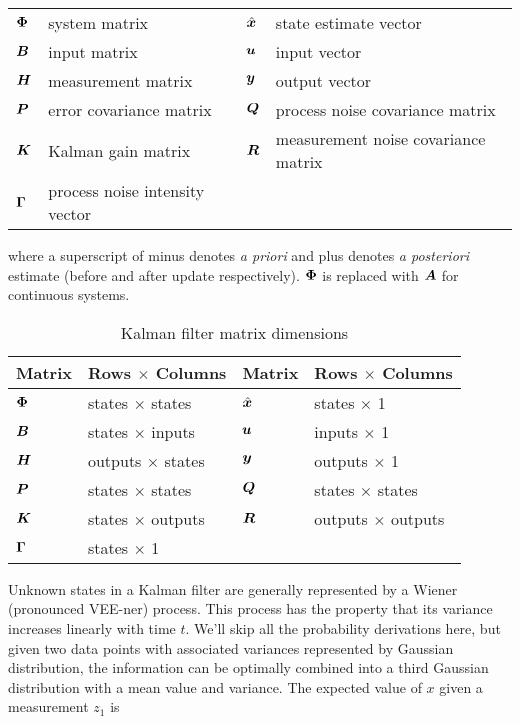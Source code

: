 \begin{center}
  \renewcommand{\arraystretch}{1.3}
  \begin{tabulary}{\linewidth}{LLLL}
    $\bm \Phi$ & system matrix & $\hat{\bm x}$ & state estimate vector \\
    $\bm B$ & input matrix            & $\bm u$ & input vector \\
    $\bm H$ & measurement matrix      & $\bm y$ & output vector \\
    $\bm P$ & error covariance matrix & $\bm Q$ & process noise covariance
      matrix \\
    $\bm K$ & Kalman gain matrix & $\bm R$ & measurement noise covariance
      matrix \\
    $\bm \Gamma$ & process noise intensity vector &
  \end{tabulary}
\end{center}

where a superscript of minus denotes \textit{a priori} and plus denotes
\textit{a posteriori} estimate (before and after update respectively).
$\bm \Phi$ is replaced with $\bm A$ for continuous systems.

\begin{table}
  \caption{Kalman filter matrix dimensions}
  \renewcommand{\arraystretch}{1.5}
  \centering
  \begin{tabular}{|ll|ll|}
    \hline
    \rowcolor{lightblue}
    \textbf{Matrix} & \textbf{Rows $\times$ Columns} &
    \textbf{Matrix} & \textbf{Rows $\times$ Columns} \\
    \hline
    $\bm \Phi$ & states $\times$ states & $\hat{\bm x}$ & states $\times$ 1
      \\
    $\bm B$ & states $\times$ inputs & $\bm u$ & inputs $\times$ 1 \\
    $\bm H$ & outputs $\times$ states & $\bm y$ & outputs $\times$ 1 \\
    $\bm P$ & states $\times$ states & $\bm Q$ & states $\times$ states \\
    $\bm K$ & states $\times$ outputs & $\bm R$ & outputs $\times$ outputs
      \\
    $\bm \Gamma$ & states $\times$ 1 &  &  \\
    \hline
  \end{tabular}
  \label{tab:kf_matrix_dims}
\end{table}

Unknown states in a Kalman filter are generally represented by a Wiener
(pronounced VEE-ner) process. This process has the property that its variance
increases linearly with time $t$. We'll skip all the probability derivations
here, but given two data points with associated variances represented by
Gaussian distribution, the information can be optimally combined into a third
Gaussian distribution with a mean value and variance. The expected value of $x$
given a measurement $z_1$ is

